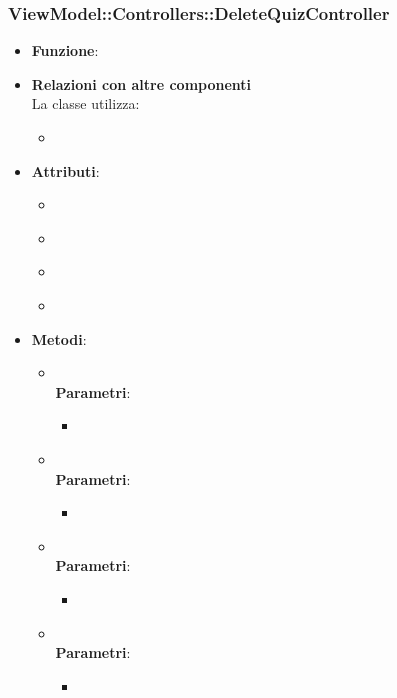 \subsubsection{ViewModel::Controllers::DeleteQuizController}
\begin{itemize}
\item\textbf{Funzione}:
\item\textbf{Relazioni con altre componenti}\\
La classe utilizza:
	\begin{itemize}
		\item
	\end{itemize}
\item\textbf{Attributi}:
	\begin{itemize}
		\item\code{}\\
		\item\code{}\\
		\item\code{}\\
		\item\code{}\\
	\end{itemize}
\item\textbf{Metodi}:
	\begin{itemize}
		\item\code{}\\
		\textbf{Parametri}:
			\begin{itemize}
				\item\code{}\\
			\end{itemize}
		\item\code{}\\
		\textbf{Parametri}:
			\begin{itemize}
				\item\code{}\\
			\end{itemize}
		\item\code{}\\
		\textbf{Parametri}:
			\begin{itemize}
				\item\code{}\\
			\end{itemize}
		\item\code{}\\
		\textbf{Parametri}:
			\begin{itemize}
				\item\code{}\\
			\end{itemize}
	\end{itemize}
\end{itemize}

